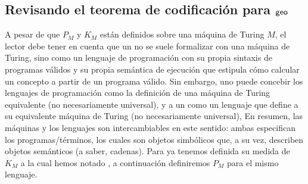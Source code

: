 \subsection{Revisando el teorema de codificación para ${\sf geo}$}


A pesar de que $P_M$ y $K_M$ están definidos sobre una máquina de Turing $M$, el lector debe tener en cuenta que un \lot no se suele formalizar con una máquina de Turing, sino como un lenguaje de programación con su propia sintaxis de programas válidos y su propia semántica de ejecución que estipula cómo calcular un concepto a partir de un programa válido. Sin embargo, uno puede concebir los lenguajes de programación como la definición de una máquina de Turing equivalente (no necesariamente universal), y a un \lot como un lenguaje que define a su equivalente máquina de Turing (no necesariamente universal), En resumen, las máquinas y los lenguajes son intercambiables en este  sentido: ambas especifican los programas/términos, los cuales son objetos simbólicos que, a su vez, describen objetos semánticos (a saber, cadenas). Para \gramgeo ya tenemos definida su medida de $K_M$ a la cual hemos notado \mdlgeo, a continuación definiremos $P_M$ para el mismo lenguaje.




